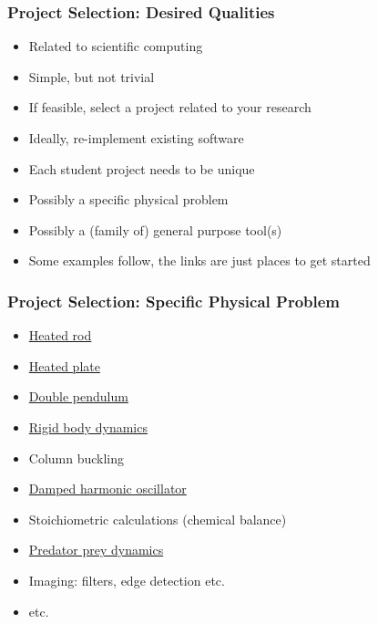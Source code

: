 \documentclass[t,12pt,numbers,fleqn]{beamer}
\begin{document}
\begin{frame}
\frametitle{Project Selection: Desired Qualities}
\begin{itemize}
\item Related to scientific computing
\item Simple, but not trivial
\item If feasible, select a project related to your research
\item Ideally, re-implement existing software
\item Each student project needs to be unique
\item Possibly a specific physical problem
\item Possibly a (family of) general purpose tool(s)
\item Some examples follow, the links are just places to get started
\end{itemize}
\end{frame}


\begin{frame}
\frametitle{Project Selection: Specific Physical Problem}
\begin{itemize}
\item
  \href{https://ocw.mit.edu/courses/mathematics/18-303-linear-partial-differential-equations-fall-2006/lecture-notes/heateqni.pdf}{
    Heated
    rod}
\item \href{http://www.tech.plym.ac.uk/sme/THER204B-web/Heatran2.PDF}{Heated plate}
\item \href{https://en.wikipedia.org/wiki/Double_pendulum}{Double pendulum}
\item \href{http://chrishecker.com/Rigid_Body_Dynamics}{Rigid body dynamics}
\item Column buckling
\item \href{https://en.wikipedia.org/wiki/Harmonic_oscillator}{Damped harmonic oscillator}
\item Stoichiometric calculations (chemical balance)
\item
  \href{http://www.tiem.utk.edu/~gross/bioed/bealsmodules/predator-prey.html}{Predator
    prey dynamics}
\item Imaging: filters, edge detection etc.
\item etc.
\end{itemize}

\end{frame}

\end{document}
